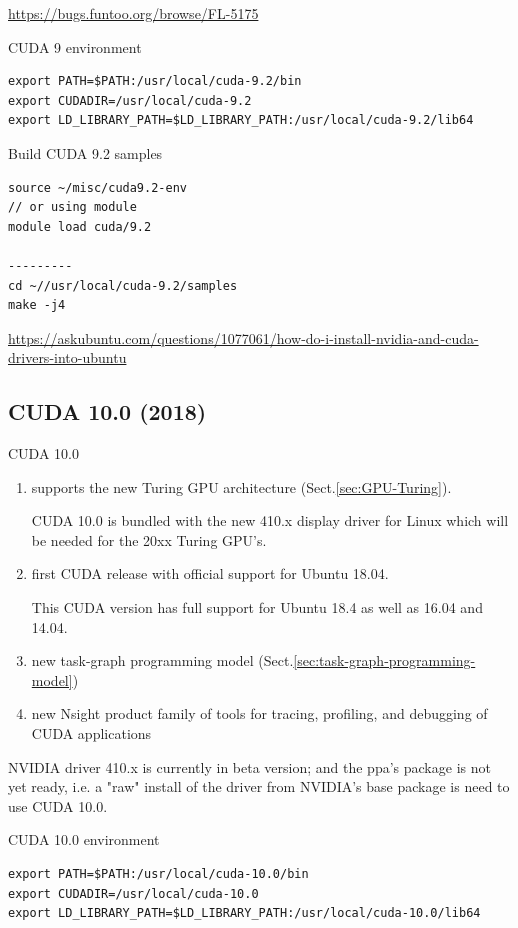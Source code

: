 \url{https://bugs.funtoo.org/browse/FL-5175}

CUDA 9 environment
\begin{verbatim}
export PATH=$PATH:/usr/local/cuda-9.2/bin
export CUDADIR=/usr/local/cuda-9.2
export LD_LIBRARY_PATH=$LD_LIBRARY_PATH:/usr/local/cuda-9.2/lib64
\end{verbatim}

Build CUDA 9.2 samples
\begin{verbatim}
source ~/misc/cuda9.2-env
// or using module
module load cuda/9.2

---------
cd ~//usr/local/cuda-9.2/samples
make -j4
\end{verbatim}

\url{https://askubuntu.com/questions/1077061/how-do-i-install-nvidia-and-cuda-drivers-into-ubuntu}

\subsection{CUDA 10.0 (2018)}
\label{sec:CUDA_10.0}

CUDA 10.0 
\begin{enumerate}
  \item supports the new Turing GPU architecture (Sect.\ref{sec:GPU-Turing}).

CUDA 10.0 is bundled with the new 410.x display driver for Linux which will be
needed for the 20xx Turing GPU's.

  \item first CUDA release with official support for Ubuntu 18.04. 
  
 This CUDA version has full support for Ubuntu 18.4 as well as 16.04 and 14.04. 
  
  \item new task-graph programming model (Sect.\ref{sec:task-graph-programming-model})
  
  \item new Nsight product family of tools for tracing, profiling, and debugging of CUDA applications
  
  
\end{enumerate}



NVIDIA driver 410.x is currently in beta version; and the ppa's package is not yet ready, i.e.
a "raw" install of the driver from NVIDIA's base package is need to use CUDA 10.0.
 
CUDA 10.0 environment
\begin{verbatim}
export PATH=$PATH:/usr/local/cuda-10.0/bin
export CUDADIR=/usr/local/cuda-10.0
export LD_LIBRARY_PATH=$LD_LIBRARY_PATH:/usr/local/cuda-10.0/lib64
\end{verbatim}


